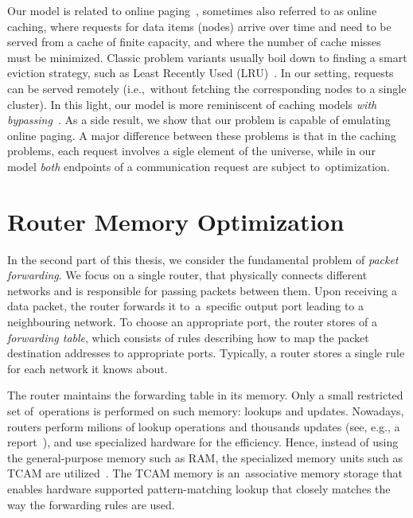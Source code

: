 Our model is related to online
paging~\cite{SleTar85,FKLMSY91,McGSle91,AcChNo00}, sometimes also referred to
as online caching, where requests for data items (nodes) arrive over time and
need to be served from a cache of finite capacity, and where the number of
cache misses must be minimized. Classic problem variants usually boil down to
finding a smart eviction strategy, such as Least Recently Used (LRU)~\cite{SleTar85}. In our
setting, requests can be served remotely (i.e.,~without fetching the
corresponding nodes to a single cluster). In this light, our model is more
reminiscent of caching models \emph{with
bypassing}~\cite{EpImLN11,EpImLN15,Irani02}. As a side result, we show that our problem is
capable of emulating online paging.
A major difference between  these problems is that in the caching problems, each request involves a sigle element of the universe, while in our model \emph{both} endpoints of a communication request are subject to~optimization.



\section{Router Memory Optimization}
\label{sec:intro-packet-forwarding}


In the second part of this thesis, we consider the fundamental problem of \emph{packet forwarding}.
We focus on a single router, that physically connects different networks and is responsible for passing packets between them.
Upon receiving a data packet, the router forwards it to~a~specific output port leading to a neighbouring network.
To choose an appropriate port, the router stores of a \emph{forwarding table}, which consists of rules describing how to map the packet destination addresses to appropriate ports.
Typically, a router stores a single rule for each network it knows about.

The router maintains the forwarding table in its memory.
Only a small restricted set of~operations is performed on such memory: lookups and updates.
Nowadays, routers perform milions of lookup operations and thousands updates (see, e.g., a report~\cite{bgp-updates}), and use specialized hardware for the efficiency.
Hence, instead of using the general-purpose memory such as RAM, the specialized memory units such as TCAM are utilized~\cite{tcam-memory}.
The TCAM memory is an~associative memory storage that enables hardware supported pattern-matching lookup that closely matches the way the forwarding rules are used.

